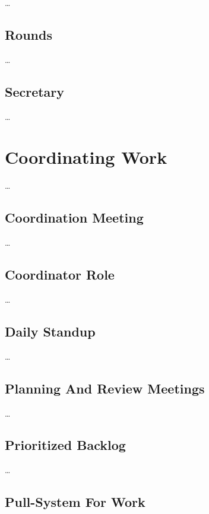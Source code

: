 {\ldots}

\section{Rounds}
\label{rounds}

{\ldots}

\section{Secretary}
\label{secretary}

{\ldots}

\chapter{Coordinating Work}
\label{coordinatingwork}

{\ldots}

\section{Coordination Meeting}
\label{coordinationmeeting}

{\ldots}

\section{Coordinator Role}
\label{coordinatorrole}

{\ldots}

\section{Daily Standup}
\label{dailystandup}

{\ldots}

\section{Planning And Review Meetings}
\label{planningandreviewmeetings}

{\ldots}

\section{Prioritized Backlog}
\label{prioritizedbacklog}

{\ldots}

\section{Pull-System For Work}
\label{pull-systemforwork}


